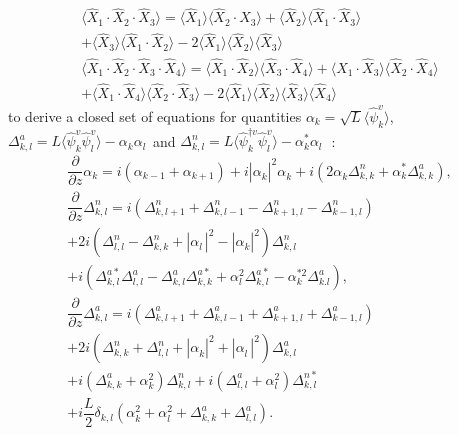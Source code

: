 \documentclass[9pt,twocolumn,twoside]{osajnl}
\begin{document}
\begin{equation}
	\begin{array}{r}
		\langle \hat{X}_1\!\cdot\!\hat{X}_2\!\cdot\!\hat{X}_3\rangle = \langle\hat{X}_1\rangle\langle\hat{X}_2\!\cdot\!\hat{X}_3\rangle + \langle\hat{X}_2\rangle\langle\hat{X}_1\!\cdot\!\hat{X}_3\rangle  \,\,\,\,\,\,\,\,\,\,\,\,\,\,\,\,\,\,\,\,\,\,\,\,\,\\+ \langle\hat{X}_3\rangle\langle\hat{X}_1\!\cdot\!\hat{X}_2\rangle - 2\langle\hat{X}_1\rangle \langle\hat{X}_2\rangle\langle\hat{X}_3\rangle \\
		\langle \hat{X}_1\!\cdot\!\hat{X}_2\!\cdot\!\hat{X}_3\!\cdot\!\hat{X}_4\rangle \!=\! \langle\hat{X}_1\!\cdot\!\hat{X}_2\rangle\langle\hat{X}_3\!\cdot\!\hat{X}_4\rangle \!+\!  \langle\hat{X}_1\!\cdot\!\hat{X}_3\rangle\langle\hat{X}_2\!\cdot\!\hat{X}_4\rangle \\+ \langle\hat{X}_1\!\cdot\!\hat{X}_4\rangle\langle\hat{X}_2\!\cdot\!\hat{X}_3\rangle - 2\langle\hat{X}_1\rangle \langle\hat{X}_2\rangle\langle\hat{X}_3\rangle\langle\hat{X}_4\rangle
	\end{array}
\end{equation}
to derive a closed set of equations for quantities $\alpha_k = \sqrt{L} \langle\hat{\psi}^{v}_{k}\rangle$, $\Delta^{a}_{k,l} = L \langle\hat{\psi}^{v}_{k}\hat{\psi}^{v}_{l}\rangle - \alpha^{\phantom{*}}_k\alpha^{\phantom{*}}_l$ and $\Delta^{n}_{k,l} = L \langle\hat{\psi}^{\dag v}_{k}\hat{\psi}^{v}_{l}\rangle - \alpha^{*}_k\alpha^{\phantom{*}}_l$~\cite{tikhonenkov_quantum_2007}: 
\begin{equation}\label{eq:second_order}
	\begin{array}{c}
		\dfrac{\partial}{\partial z}\alpha_{k}\! =\! i\left(\alpha_{k-1}\! +\! \alpha_{k+1} \right) \!+\! i\left|\alpha^{\phantom{*}}_{k}\!\right|^{2}\alpha^{\phantom{*}}_{k} \!\!+\! i\left(2\alpha^{\phantom{*}}_{k}\Delta^{n}_{k,k} \!+\! \alpha^{*}_{k}\Delta^{a}_{k,k}\right),\\
		\dfrac{\partial}{\partial z}\Delta^{n}_{k,l} = i\left(\Delta^{n}_{k,l+1} + \Delta^{n}_{k,l-1} - \Delta^{n}_{k+1,l} - \Delta^{n}_{k-1,l}\right) \\+ 2i\left(\Delta^{n}_{l,l} - \Delta^{n}_{k,k} + \left|\alpha^{\phantom{*}}_{l}\!\right|^{2} -\left|\alpha^{\phantom{*}}_{k}\right|^{2}\right)\Delta^{n}_{k,l}  \\
		+ i\left(\Delta^{a*}_{k,l}\Delta^{a}_{l,l} - \Delta^{a}_{k,l}\Delta^{a*}_{k,k} + \alpha^{2}_{l}\Delta^{a*}_{k,l} - \alpha^{*2}_{k}\Delta^{a}_{k.l}\right), \\
		\dfrac{\partial}{\partial z}\Delta^{a}_{k,l} = i\left(\Delta^{a}_{k,l+1} + \Delta^{a}_{k,l-1} + \Delta^{a}_{k+1,l} + \Delta^{a}_{k-1,l}\right)  \\+ 2i\left(\Delta^{n}_{k,k} + \Delta^{n}_{l,l} + \left|\alpha^{\phantom{*}}_{k}\right|^{2} + \left|\alpha^{\phantom{*}}_{l}\!\right|^{2}\right)\Delta^{a}_{k,l}  \\
		+ i\left(\Delta^{a}_{k,k} + \alpha^{2}_{k}\right)\Delta^{n}_{k,l} + i\left(\Delta^{a}_{l,l} + \alpha^{2}_{l}\right)\Delta^{n*}_{k,l} \\+ i\dfrac{L}{2}\delta_{k,l}\left(\alpha^{2}_{k} + \alpha^{2}_{l} + \Delta^{a}_{k,k} + \Delta^{a}_{l,l}\right).
	\end{array}
\end{equation}
\end{document}
